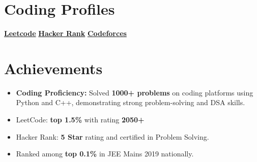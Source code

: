 \documentclass[letterpaper,11pt]{article}
\newcommand{\resumeItem}[1]{
  \item\small{
    {#1 \vspace{-2pt}}
  }
}
\newcommand{\resumeItemListStart}{\begin{itemize}}
\newcommand{\resumeItemListEnd}{\end{itemize}\vspace{-5pt}}
\begin{document}
 \vspace{-15pt}
 \section{Coding Profiles}    
        \textbf{        } \textbf{        }  \textbf{\href{https://leetcode.com/u/mohankumarkadiri/}{Leetcode}}
        \textbf{          } \textbf{             } \textbf{           }
        \textbf{\href{https://www.hackerrank.com/profile/mohankumarkadiri}{Hacker Rank}}
        \textbf{          } \textbf{             } \textbf{           }  \textbf{\href{https://codeforces.com/profile/mohankumarkadiri}{Codeforces}}
\vspace{-7pt}
\section{Achievements}
      \resumeItemListStart
        \resumeItem{ \textbf{Coding Proficiency:} Solved \textbf{1000+ problems} on coding platforms using Python and C++, demonstrating strong problem-solving and DSA skills.} 
        \resumeItem{LeetCode: \textbf{top 1.5\%} with rating \textbf{2050+}}
        \resumeItem{Hacker Rank: \textbf{5 Star} rating and certified in Problem Solving.}
        \resumeItem{Ranked among \textbf{top 0.1\%} in JEE Mains 2019 nationally.}
      \resumeItemListEnd
\end{document}
